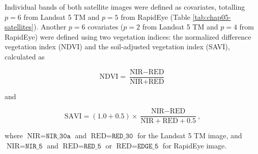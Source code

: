 
Individual bands of both satellite images were defined as covariates, totalling $p = 6$ from Landsat 5 TM and 
$p = 5$ from RapidEye (Table \ref{tab:chap05-satellites}). Another $p = 6$ covariates ($p = 2$ from Landsat 5 
TM and $p = 4$ from RapidEye) were defined using two vegetation indices: the normalized difference vegetation 
index (NDVI) and the soil-adjusted vegetation index (SAVI), calculated as

\begin{equation}\label{eqn:ndvi}
 \text{NDVI} = \frac{\text{NIR} - \text{RED}}{\text{NIR} + \text{RED}}
\end{equation}

\noindent and 

\begin{equation}\label{eqn:savi}
  \text{SAVI} = (1.0 + 0.5) \times \frac{\text{NIR} - \text{RED}}{\text{NIR} + \text{RED} + 0.5},
\end{equation}

\noindent where $\text{NIR} = \texttt{NIR\_30a}$ and $\text{RED} = \texttt{RED\_30}$ for the Landsat 5 TM 
image, and $\text{NIR} = \texttt{NIR\_5}$ and $\text{RED} = \texttt{RED\_5}$ or $\text{RED} = 
\texttt{EDGE\_5}$ for RapidEye image.


